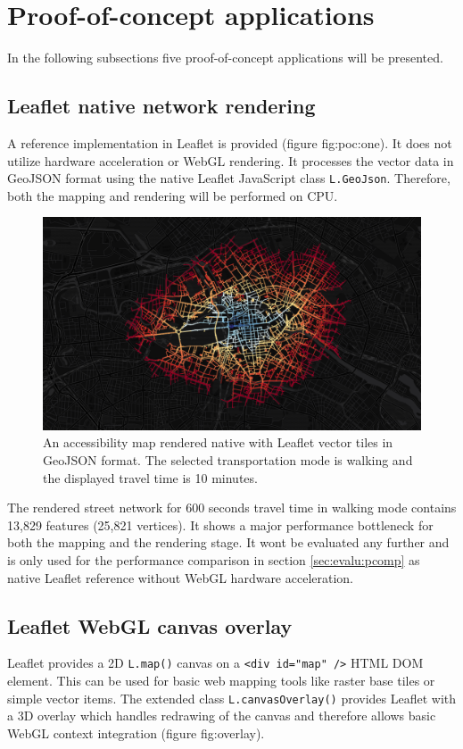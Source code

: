   \section{Proof-of-concept applications}
    \label{sec:imple:applc}
    In the following subsections five proof-of-concept applications will be presented.\par
    \subsection{Leaflet native network rendering}
      \label{sec:imple:applc:nativ}
      A reference implementation in Leaflet is provided (figure {fig:poc:one}). It does not utilize hardware acceleration or WebGL rendering. It processes the vector data in GeoJSON format using the native Leaflet JavaScript class \texttt{L.GeoJson}. Therefore, both the mapping and rendering will be performed on CPU.\par
      \begin{figure}[h]
        \centering
        \includegraphics[width=0.7\linewidth]{./img/screenshot-poc1-600s-native.png}
        \caption{An accessibility map rendered native with Leaflet vector tiles in GeoJSON format. The selected transportation mode is walking and the displayed travel time is 10 minutes.}
        \label{fig:poc:one}
      \end{figure}
      The rendered street network for 600 seconds travel time in walking mode contains 13,829 features (25,821 vertices). It shows a major performance bottleneck for both the mapping and the rendering stage. It wont be evaluated any further and is only used for the performance comparison in section \ref{sec:evalu:pcomp} as native Leaflet reference without WebGL hardware acceleration.

    \subsection{Leaflet WebGL canvas overlay}
      \label{sec:imple:applc:canvs}
      Leaflet provides a 2D \texttt{L.map()} canvas on a \texttt{<div id="map" />} HTML DOM element. This can be used for basic web mapping tools like raster base tiles or simple vector items. The extended class \texttt{L.canvasOverlay()} provides Leaflet with a 3D overlay which handles redrawing of the canvas and therefore allows basic WebGL context integration (figure {fig:overlay}).

